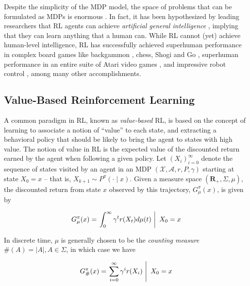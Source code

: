 Despite the simplicity of the MDP model, the space of problems that
can be formulated as MDPs is enormous \citep{barto1981associative}. In fact, it
has been hypothesized by leading researchers that RL agents can achieve
\emph{artificial general intelligence} \citep{SILVER2021103535}, implying that
they can learn anything that a human can. While RL cannot (yet) achieve
human-level intelligence, RL has successfully achieved superhuman performance in
complex board games like backgammon \citep{tesauro1994td}, chess, Shogi and Go
\citep{silver2018general}, superhuman performance in an entire suite of Atari
video games \citep{mnih2015human, hessel2018rainbow, badia2020agent57}, and
impressive robot control \citep{lin1993scaling, smart2002effective,
peters2003reinforcement, lillicrap2015continuous, higuera2018synthesizing,
bellemare2020autonomous}, among many other accomplishments. 

\subsection{Value-Based Reinforcement Learning}
A common paradigm in RL, known as \emph{value-based} RL, is based on
the concept of learning to associate a notion of ``value'' to each
state, and extracting a behavioral policy that should be likely to
bring the agent to states with high value. The notion of value in RL is
the expected value of the discounted return earned by the agent when
following a given policy. Let $(X_i)_{i=0}^\infty$ denote the sequence of
states visited by an agent in an MDP
$(\mathcal{X},\mathcal{A},r,P,\gamma)$ starting at state
$X_0=x$ -- that is, $X_{k+1}\sim P^\pi(\cdot\mid x)$. Given a measure space $(\mathbf{R}_+,\Sigma,
\mu)$, the discounted return from state $x$ observed by this
trajectory, $G^\pi_\mu(x)$, is given by

\begin{equation}
  \label{eq:return:abstract}
  G^\pi_{\mu}(x) = \left. \int_{0}^\infty\gamma^tr(X_t)d\mu(t)\ \right\rvert\ X_0 = x
\end{equation}

In discrete time, $\mu$ is generally chosen to be the \emph{counting
  measure} $\#(A) = |A|, A\in\Sigma$, in which case we have

\begin{equation}
  \label{eq:bg:rl:value-based:return}
  G^\pi_{\#}(x) = \left. \sum_{i=0}^\infty\gamma^ir(X_i)\ \right\rvert\ X_0 = x
\end{equation}

